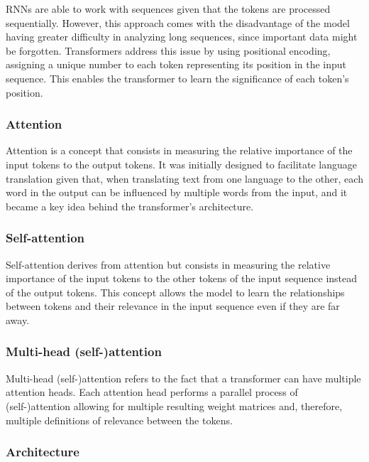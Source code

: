 RNNs are able to work with sequences given that the tokens are processed sequentially. However, this approach comes with the disadvantage of the model having greater difficulty in analyzing long sequences, since important data might be forgotten. Transformers address this issue by using positional encoding, assigning a unique number to each token representing its position in the input sequence. This enables the transformer to learn the significance of each token's position.

\subsubsection{Attention}

Attention is a concept that consists in measuring the relative importance of the input tokens to the output tokens. It was initially designed to facilitate language translation given that, when translating text from one language to the other, each word in the output can be influenced by multiple words from the input, and it became a key idea behind the transformer's architecture.

\subsubsection{Self-attention}

Self-attention derives from attention but consists in measuring the relative importance of the input tokens to the other tokens of the input sequence instead of the output tokens. This concept allows the model to learn the relationships between tokens and their relevance in the input sequence even if they are far away.
 
\subsubsection{Multi-head (self-)attention}

Multi-head (self-)attention refers to the fact that a transformer can have multiple attention heads. Each attention head performs a parallel process of (self-)attention allowing for multiple resulting weight matrices and, therefore, multiple definitions of relevance between the tokens.

\subsubsection{Architecture}

